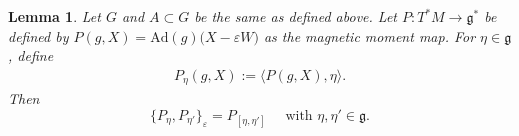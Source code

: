 \documentclass[11pt]{amsart}
\newtheorem{lemma}[theorem]{Lemma}
\theoremstyle{definition}
\theoremstyle{plain}
\theoremstyle{conclusion}
\begin{document}
 \begin{lemma}
 \label{lem:F1polypbrack} \cite[Proposition 3]{MR2141306}
Let $G $ and $A\subset G$  be the same as defined above. Let $P:T^*M\longrightarrow\mathfrak{g}^*$ be defined by $P(g,X)=\mathrm{Ad}(g)\bigl(X-\varepsilon W\bigr)$ as the magnetic moment map. For $\eta\in\mathfrak{g}$, define \begin{align}
P_\eta(g,X):=\langle P(g,X),\eta \rangle   . \label{eq:comoment}
\end{align}   Then \begin{equation}\label{eq:f1bracket}
\{P_\eta,P_{\eta'}\}_\varepsilon = P_{[\eta,{\eta'}]}\quad \text{ with }\eta,\eta'\in\mathfrak{g} .
\end{equation}  %
\end{lemma}
\end{document}
